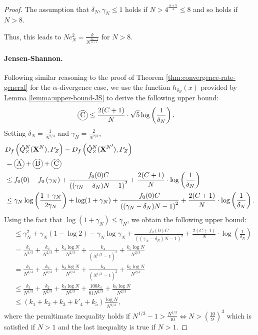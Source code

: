 \begin{proof}
The assumption that $\delta_N, \gamma_N \leq 1$ holds if $N>4^\frac{\alpha+5}{4}\leq8$ and so holds if $N>8$.

Thus, this leads to $Nc_N^2 = \frac{k}{N^{\frac{3\alpha - 1}{\alpha+5}}}$ for $N>8$.


\paragraph{Jensen-Shannon.}

Following similar reasoning to the proof of Theorem \ref{thm:convergence-rate-general} for the $\alpha$-divergence case, we use the function $h_{\delta_N}(x)$ provided by Lemma \ref{lemma:upper-bound-JS} to derive the following upper bound:
%
\begin{align*}
    \encircle{C} &\leq \frac{2(C+1)}{N} \cdot \sqrt{5}\log\left(\frac{1}{\delta_N}\right).
\end{align*}
%
Setting $\delta_N = \frac{1}{N^{2/3}}$ and $\gamma_N = \frac{2}{N^{2/3}}$,
%
\begin{align*}
    &D_f\left( \hat{Q}_Z^N(\XN) , P_Z\right) - D_f\left( \hat{Q}_Z^N({\XN}') , P_Z\right) \\
    &= \encircle{A} + \encircle{B} + \encircle{C} \\
    &\leq f_0(0) - f_0\left(\gamma_N\right) + \frac{f_0(0)C}{\left((\gamma_N-\delta_N)N - 1\right)^2} + \frac{2(C+1)}{N} \cdot \log\left(\frac{1}{\delta_N}\right) \\
    &\leq \gamma_N \log\left(\frac{1+\gamma_N}{2\gamma_N}\right) + \log(1+\gamma_N) + \frac{f_0(0)C}{\left((\gamma_N-\delta_N)N - 1\right)^2} + \frac{2(C+1)}{N} \cdot \log\left(\frac{1}{\delta_N}\right).
\end{align*}
%
Using the fact that $\log(1+\gamma_N)\leq \gamma_N$, we obtain the following upper bound:
%
\begin{align*}
    &\leq \gamma_N^2 + \gamma_N(1-\log 2 ) - \gamma_N \log \gamma_N + \frac{f_0(0)C}{\left((\gamma_N-\delta_N)N - 1\right)^2} + \frac{2(C+1)}{N} \cdot \log\left(\frac{1}{\delta_N}\right)\\
    &= \frac{k_1}{N^{4/3}} + \frac{k_2}{N^{2/3}} + \frac{k_3\log N}{N^{2/3}} + \frac{k_4}{(N^{1/3} - 1)^2} +\frac{k_5 \log N }{ N^{2/3}} \\
    &= \frac{k_1}{N^{4/3}} + \frac{k_2}{N^{2/3}} + \frac{k_3\log N}{N^{2/3}} + \frac{k_4}{(N^{1/3} - 1)^2} +\frac{k_5 \log N }{ N^{2/3}} \\
    &\leq \frac{k_1}{N^{4/3}} + \frac{k_2}{N^{2/3}} + \frac{k_3\log N}{N^{2/3}} + \frac{100k_4}{81N^{2/3}} +\frac{k_5 \log N }{ N^{2/3}} \\
    &\leq (k_1+k_2+k_3+k'_4 + k_5)\frac{\log N}{N^{2/3}},
\end{align*}
where the penultimate inequality holds if $N^{1/3}-1 > \frac{N^{1/3}}{10} \iff N>\left(\frac{10}{9}\right)^3$ which is satisfied if $N>1$ and the last inequality is true if $N>1$.


\end{proof}
